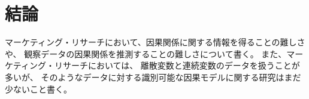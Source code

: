 
\section{結論}
\label{part:conclusion}

マーケティング・リサーチにおいて、因果関係に関する情報を得ることの難しさや、
観察データの因果関係を推測することの難しさについて書く。
また、マーケティング・リサーチにおいては、
離散変数と連続変数のデータを扱うことが多いが、
そのようなデータに対する識別可能な因果モデルに関する研究はまだ少ないこと書く。






